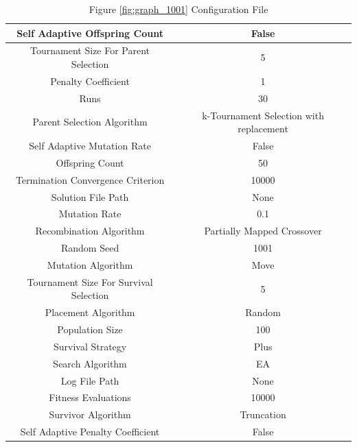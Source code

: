 \documentclass{standalone}
\begin{document}
\begin{table}[!htb]
	\centering
	\caption{Figure \ref{fig:graph_1001} Configuration File}
	\label{tab:graph_1001}
	\begin{tabular}{| c | c |}
		\hline
		Self Adaptive Offspring Count		& False		 \\
		\hline
		Tournament Size For Parent Selection		& 5		 \\
		\hline
		Penalty Coefficient		& 1		 \\
		\hline
		Runs		& 30		 \\
		\hline
		Parent Selection Algorithm		& k-Tournament Selection with replacement		 \\
		\hline
		Self Adaptive Mutation Rate		& False		 \\
		\hline
		Offspring Count		& 50		 \\
		\hline
		Termination Convergence Criterion		& 10000		 \\
		\hline
		Solution File Path		& None		 \\
		\hline
		Mutation Rate		& 0.1		 \\
		\hline
		Recombination Algorithm		& Partially Mapped Crossover		 \\
		\hline
		Random Seed		& 1001		 \\
		\hline
		Mutation Algorithm		& Move		 \\
		\hline
		Tournament Size For Survival Selection		& 5		 \\
		\hline
		Placement Algorithm		& Random		 \\
		\hline
		Population Size		& 100		 \\
		\hline
		Survival Strategy		& Plus		 \\
		\hline
		Search Algorithm		& EA		 \\
		\hline
		Log File Path		& None		 \\
		\hline
		Fitness Evaluations		& 10000		 \\
		\hline
		Survivor Algorithm		& Truncation		 \\
		\hline
		Self Adaptive Penalty Coefficient		& False		 \\
		\hline
	\end{tabular}
\end{table}
\end{document}
